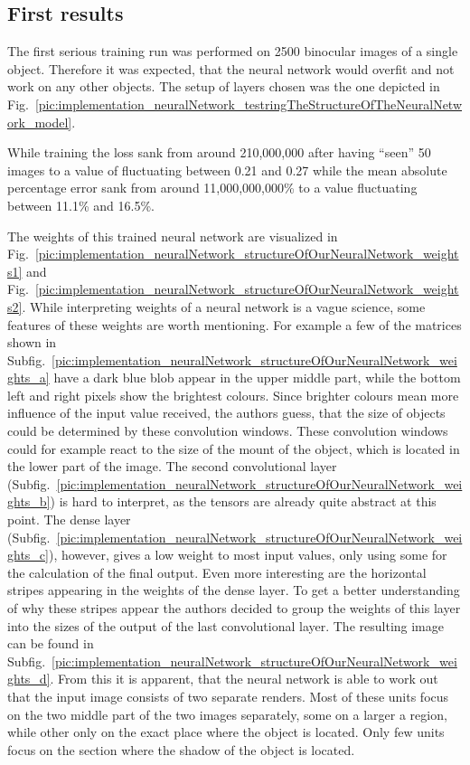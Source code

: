 \subsection{First results}
The first serious training run was performed on 2500 binocular images of a single object. Therefore it was expected, that the neural network would overfit and not work on any other objects. The setup of layers chosen was the one depicted in Fig.~\ref{pic:implementation_neuralNetwork_testringTheStructureOfTheNeuralNetwork_model}.

While training the loss sank from around 210,000,000 after having ``seen'' 50 images to a value of fluctuating between 0.21 and 0.27 while the mean absolute percentage error sank from around 11,000,000,000\% to a value fluctuating between 11.1\% and 16.5\%.

The weights of this trained neural network are visualized in Fig.~\ref{pic:implementation_neuralNetwork_structureOfOurNeuralNetwork_weights1} and Fig.~\ref{pic:implementation_neuralNetwork_structureOfOurNeuralNetwork_weights2}. While interpreting weights of a neural network is a vague science, some features of these weights are worth mentioning. For example a few of the matrices shown in Subfig.~\ref{pic:implementation_neuralNetwork_structureOfOurNeuralNetwork_weights_a} have a dark blue blob appear in the upper middle part, while the bottom left and right pixels show the brightest colours. Since brighter colours mean more influence of the input value received, the authors guess, that the size of objects could be determined by these convolution windows. These convolution windows could for example react to the size of the mount of the object, which is located in the lower part of the image. The second convolutional layer (Subfig.~\ref{pic:implementation_neuralNetwork_structureOfOurNeuralNetwork_weights_b}) is hard to interpret, as the tensors are already quite abstract at this point. The dense layer (Subfig.~\ref{pic:implementation_neuralNetwork_structureOfOurNeuralNetwork_weights_c}), however, gives a low weight to most input values, only using some for the calculation of the final output. Even more interesting are the horizontal stripes appearing in the weights of the dense layer. To get a better understanding of why these stripes appear the authors decided to group the weights of this layer into the sizes of the output of the last convolutional layer. The resulting image can be found in Subfig.~\ref{pic:implementation_neuralNetwork_structureOfOurNeuralNetwork_weights_d}. From this it is apparent, that the neural network is able to work out that the input image consists of two separate renders. Most of these units focus on the two middle part of the two images separately, some on a larger a region, while other only on the exact place where the object is located. Only few units focus on the section where the shadow of the object is located.

